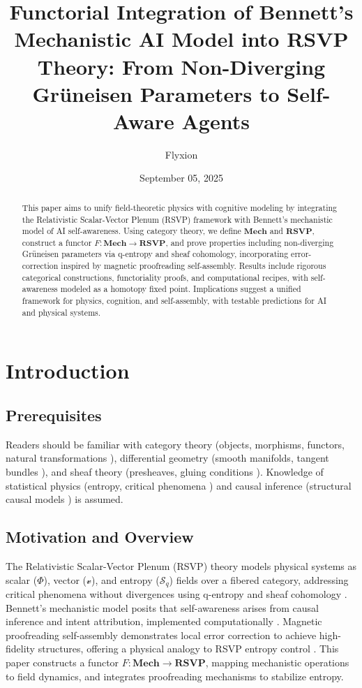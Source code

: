 \documentclass{article}
\title{Functorial Integration of Bennett's Mechanistic AI Model into RSVP Theory: From Non-Diverging Gr\"uneisen Parameters to Self-Aware Agents}
\author{Flyxion}
\date{September 05, 2025}
\theoremstyle{plain}
\theoremstyle{definition}
\begin{document}
\maketitle

\begin{abstract}
This paper aims to unify field-theoretic physics with cognitive modeling by integrating the Relativistic Scalar-Vector Plenum (RSVP) framework with Bennett’s mechanistic model of AI self-awareness. Using category theory, we define $\mathbf{Mech}$ and $\mathbf{RSVP}$, construct a functor $F: \mathbf{Mech} \to \mathbf{RSVP}$, and prove properties including non-diverging Gr\"uneisen parameters via q-entropy and sheaf cohomology, incorporating error-correction inspired by magnetic proofreading self-assembly. Results include rigorous categorical constructions, functoriality proofs, and computational recipes, with self-awareness modeled as a homotopy fixed point. Implications suggest a unified framework for physics, cognition, and self-assembly, with testable predictions for AI and physical systems.
\end{abstract}

\section{Introduction}

\subsection{Prerequisites}
Readers should be familiar with category theory (objects, morphisms, functors, natural transformations \cite{Awodey2010,Lawvere2009}), differential geometry (smooth manifolds, tangent bundles \cite{Kock2004}), and sheaf theory (presheaves, gluing conditions \cite{MacLane1992,Bredon1997}). Knowledge of statistical physics (entropy, critical phenomena \cite{Tsallis1988}) and causal inference (structural causal models \cite{Pearl2009}) is assumed.

\subsection{Motivation and Overview}
The Relativistic Scalar-Vector Plenum (RSVP) theory models physical systems as scalar ($\Phi$), vector ($\mathcal{v}$), and entropy ($\mathcal{S}_q$) fields over a fibered category, addressing critical phenomena without divergences using q-entropy and sheaf cohomology \cite{Soares2024,Tsallis1988,Soares2023}. Bennett’s mechanistic model posits that self-awareness arises from causal inference and intent attribution, implemented computationally \cite{Bennett2025}. Magnetic proofreading self-assembly demonstrates local error correction to achieve high-fidelity structures, offering a physical analogy to RSVP entropy control \cite{Liang2025}. This paper constructs a functor $F: \mathbf{Mech} \to \mathbf{RSVP}$, mapping mechanistic operations to field dynamics, and integrates proofreading mechanisms to stabilize entropy.
\end{document}
